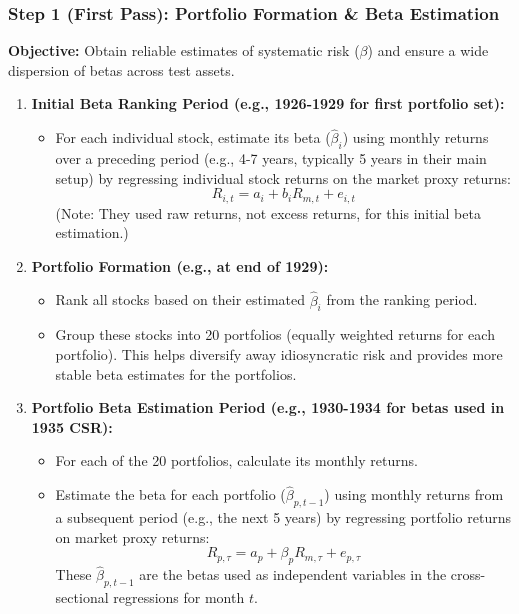 \documentclass[10pt]{beamer}
\begin{document}
\begin{frame}[allowframebreaks]
  \frametitle{Step 1 (First Pass): Portfolio Formation \& Beta Estimation}
  \textbf{Objective:} Obtain reliable estimates of systematic risk ($\beta$) and ensure a wide dispersion of betas across test assets.

  \begin{enumerate}
    \item \textbf{Initial Beta Ranking Period (e.g., 1926-1929 for first portfolio set):}
      \begin{itemize}
        \item For each individual stock, estimate its beta ($\hat{\beta}_i$) using monthly returns over a preceding period (e.g., 4-7 years, typically 5 years in their main setup) by regressing individual stock returns on the market proxy returns:
              \[ R_{i,t} = a_i + b_i R_{m,t} + e_{i,t} \]
              (Note: They used raw returns, not excess returns, for this initial beta estimation.)
      \end{itemize}

    \item \textbf{Portfolio Formation (e.g., at end of 1929):}
      \begin{itemize}
        \item Rank all stocks based on their estimated $\hat{\beta}_i$ from the ranking period.
        \item Group these stocks into 20 portfolios (equally weighted returns for each portfolio). This helps diversify away idiosyncratic risk and provides more stable beta estimates for the portfolios.
      \end{itemize}

    \item \textbf{Portfolio Beta Estimation Period (e.g., 1930-1934 for betas used in 1935 CSR):}
      \begin{itemize}
        \item For each of the 20 portfolios, calculate its monthly returns.
        \item Estimate the beta for each portfolio ($\hat{\beta}_{p,t-1}$) using monthly returns from a subsequent period (e.g., the next 5 years) by regressing portfolio returns on market proxy returns:
              \[ R_{p,\tau} = a_p + \beta_p R_{m,\tau} + e_{p,\tau} \]
              These $\hat{\beta}_{p,t-1}$ are the betas used as independent variables in the cross-sectional regressions for month $t$.
      \end{itemize}


\end{enumerate}
\end{frame}
\end{document}
